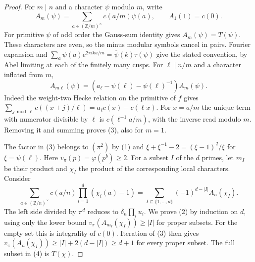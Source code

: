 \documentclass[11pt]{article}
\newcommand{\Z}{\mathbb Z}
\begin{document}
\begin{proof}
For $m\mid n$ and a character $\psi$ modulo $m$, write
\[
 A_m(\psi)=\sum_{a\in(\Z/m)^\times} c(a/m)\psi(a),\qquad A_1(1)=c(0).
\]
For primitive $\psi$ of odd order the Gauss-sum identity gives
$A_m(\psi)=T(\psi)$. These characters are even, so the minus modular
symbols cancel in pairs. Fourier expansion and
$\sum_a\psi(a)e^{2\pi ika/m}=\overline\psi(k)\tau(\psi)$ give the
stated convention, by Abel limiting at each of the finitely many cusps.
For $\ell\mid n/m$ and a character inflated from $m$,
\[
 A_{m\ell}(\psi)=
 (a_\ell-\psi(\ell)-\psi(\ell)^{-1})A_m(\psi).
 \tag{3}
\]
Indeed the weight-two Hecke relation on the primitive of $f$ gives
$\sum_{j\bmod\ell} c((x+j)/\ell)=a_\ell c(x)-c(\ell x)$.
For $x=a/m$ the unique term with numerator divisible by $\ell$
is $c(\ell^{-1}a/m)$, with the inverse read modulo $m$.
Removing it and summing proves (3), also for $m=1$.

The factor in (3) belongs to $(\pi^2)$ by (1) and
$\xi+\xi^{-1}-2=(\xi-1)^2/\xi$ for $\xi=\psi(\ell)$.
Here $v_\pi(p)=\varphi(p^b)\ge2$. For a subset $I$ of the
$d$ primes, let $m_I$ be their product and $\chi_I$ the product
of the corresponding local characters. Consider
\[
 \sum_{a\in(\Z/n)^\times}c(a/n)\prod_{i=1}^d(\chi_i(a)-1)
   =\sum_{I\subseteq\{1,\dots,d\}}(-1)^{d-|I|}A_n(\chi_I).
 \tag{4}
\]
The left side divided by $\pi^d$ reduces to
$\delta_n\prod_i u_i$. We prove (2) by induction on $d$, using
only the lower bound $v_\pi(A_{m_I}(\chi_I))\ge|I|$ for proper
subsets. For the empty set this is integrality of $c(0)$.
Iteration of (3) then gives
$v_\pi(A_n(\chi_I))\ge |I|+2(d-|I|)\ge d+1$
for every proper subset. The full subset in (4) is $T(\chi)$.
\end{proof}
\end{document}
